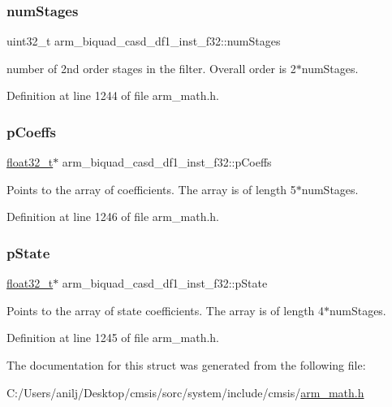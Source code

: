 \subsubsection{\texorpdfstring{num\+Stages}{numStages}}
{\footnotesize\ttfamily uint32\+\_\+t arm\+\_\+biquad\+\_\+casd\+\_\+df1\+\_\+inst\+\_\+f32\+::num\+Stages}

number of 2nd order stages in the filter. Overall order is 2$\ast$num\+Stages. 

Definition at line 1244 of file arm\+\_\+math.\+h.

\mbox{\label{structarm__biquad__casd__df1__inst__f32_af9df3820576fb921809d1462c9c6d16c}} 
\subsubsection{\texorpdfstring{p\+Coeffs}{pCoeffs}}
{\footnotesize\ttfamily \hyperlink{arm__math_8h_a4611b605e45ab401f02cab15c5e38715}{float32\+\_\+t}$\ast$ arm\+\_\+biquad\+\_\+casd\+\_\+df1\+\_\+inst\+\_\+f32\+::p\+Coeffs}

Points to the array of coefficients. The array is of length 5$\ast$num\+Stages. 

Definition at line 1246 of file arm\+\_\+math.\+h.

\mbox{\label{structarm__biquad__casd__df1__inst__f32_a8c245d79e0d8cfabc82409d4b54fb682}} 
\subsubsection{\texorpdfstring{p\+State}{pState}}
{\footnotesize\ttfamily \hyperlink{arm__math_8h_a4611b605e45ab401f02cab15c5e38715}{float32\+\_\+t}$\ast$ arm\+\_\+biquad\+\_\+casd\+\_\+df1\+\_\+inst\+\_\+f32\+::p\+State}

Points to the array of state coefficients. The array is of length 4$\ast$num\+Stages. 

Definition at line 1245 of file arm\+\_\+math.\+h.



The documentation for this struct was generated from the following file\+:\begin{DoxyCompactItemize}
\item 
C\+:/\+Users/anilj/\+Desktop/cmsis/sorc/system/include/cmsis/\hyperlink{arm__math_8h}{arm\+\_\+math.\+h}\end{DoxyCompactItemize}
